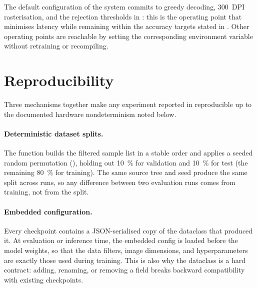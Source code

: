 The default configuration of the system commits to greedy decoding,
\SI{300}{DPI} rasterisation, and the rejection thresholds in
: this is the operating
point that minimises latency while remaining within the accuracy
targets stated in .
Other operating points are reachable by setting the corresponding
environment variable without retraining or recompiling.

\section{Reproducibility}
\label{sec:impl-reproducibility}

Three mechanisms together make any experiment reported in
 reproducible up to the documented hardware
nondeterminism noted below.

\paragraph{Deterministic dataset splits.}
The  function builds the filtered sample list in a
stable order and applies a seeded random permutation (),
holding out \SI{10}{\percent} for validation and \SI{10}{\percent} for
test (the remaining \SI{80}{\percent} for training).
The same source tree and seed produce the same split across runs, so
any difference between two evaluation runs comes from training, not
from the split.

\paragraph{Embedded configuration.}
Every checkpoint contains a JSON-serialised copy of the 
dataclass that produced it.
At evaluation or inference time, the embedded config is loaded before
the model weights, so that the data filters, image dimensions, and
hyperparameters are exactly those used during training.
This is also why the  dataclass is a hard contract:
adding, renaming, or removing a field breaks backward compatibility
with existing checkpoints.

